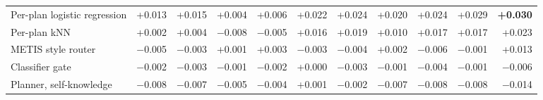 \begin{table}[t]
\begin{tabular*}{\linewidth}{@{\extracolsep{\fill}}lrrrrrrrrrr@{}}
Per-plan logistic regression & +0.013 & +0.015 & +0.004 & +0.006 & +0.022 & +0.024 & +0.020 & +0.024 & +0.029 & \textbf{+0.030} \\
Per-plan kNN & +0.002 & +0.004 & $-$0.008 & $-$0.005 & +0.016 & +0.019 & +0.010 & +0.017 & +0.017 & +0.023 \\
METIS style router & $-$0.005 & $-$0.003 & +0.001 & +0.003 & $-$0.003 & $-$0.004 & +0.002 & $-$0.006 & $-$0.001 & +0.013 \\
\midrule
Classifier gate & $-$0.002 & $-$0.003 & $-$0.001 & $-$0.002 & +0.000 & $-$0.003 & $-$0.001 & $-$0.004 & $-$0.001 & $-$0.006 \\
Planner, self-knowledge & $-$0.008 & $-$0.007 & $-$0.005 & $-$0.004 & +0.001 & $-$0.002 & $-$0.007 & $-$0.008 & $-$0.008 & $-$0.014 \\
\bottomrule
\end{tabular*}
\end{table}
